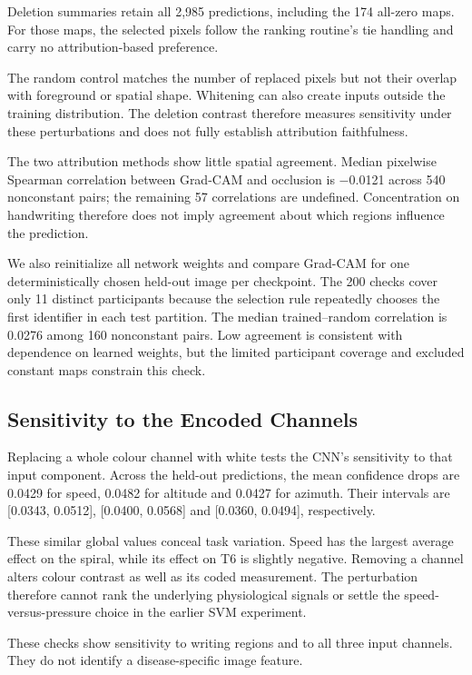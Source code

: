 Deletion summaries retain all 2,985 predictions, including the 174 all-zero maps. For those maps, the selected pixels follow the ranking routine's tie handling and carry no attribution-based preference.

The random control matches the number of replaced pixels but not their overlap with foreground or spatial shape. Whitening can also create inputs outside the training distribution. The deletion contrast therefore measures sensitivity under these perturbations and does not fully establish attribution faithfulness.

The two attribution methods show little spatial agreement. Median pixelwise Spearman correlation between Grad-CAM and occlusion is $-$0.0121 across 540 nonconstant pairs; the remaining 57 correlations are undefined. Concentration on handwriting therefore does not imply agreement about which regions influence the prediction.

We also reinitialize all network weights and compare Grad-CAM for one deterministically chosen held-out image per checkpoint. The 200 checks cover only 11 distinct participants because the selection rule repeatedly chooses the first identifier in each test partition. The median trained--random correlation is 0.0276 among 160 nonconstant pairs. Low agreement is consistent with dependence on learned weights, but the limited participant coverage and excluded constant maps constrain this check.

\subsection{Sensitivity to the Encoded Channels}
\noindent
Replacing a whole colour channel with white tests the CNN's sensitivity to that input component. Across the held-out predictions, the mean confidence drops are 0.0429 for speed, 0.0482 for altitude and 0.0427 for azimuth. Their intervals are [0.0343, 0.0512], [0.0400, 0.0568] and [0.0360, 0.0494], respectively.

These similar global values conceal task variation. Speed has the largest average effect on the spiral, while its effect on T6 is slightly negative. Removing a channel alters colour contrast as well as its coded measurement. The perturbation therefore cannot rank the underlying physiological signals or settle the speed-versus-pressure choice in the earlier SVM experiment.

These checks show sensitivity to writing regions and to all three input channels. They do not identify a disease-specific image feature.
